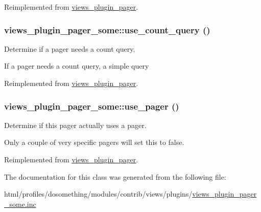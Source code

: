 Reimplemented from \hyperlink{classviews__plugin__pager_a12df2a012d53b9276a14fae94511f686}{views\_\-plugin\_\-pager}.\hypertarget{classviews__plugin__pager__some_adb625dcd5e5cf98f964f4e1c25681a6e}{
\subsubsection[{use\_\-count\_\-query}]{\setlength{\rightskip}{0pt plus 5cm}views\_\-plugin\_\-pager\_\-some::use\_\-count\_\-query ()}}
\label{classviews__plugin__pager__some_adb625dcd5e5cf98f964f4e1c25681a6e}
Determine if a pager needs a count query.

If a pager needs a count query, a simple query 

Reimplemented from \hyperlink{classviews__plugin__pager_a693a102e85a9b63bc59057a4efca0d12}{views\_\-plugin\_\-pager}.\hypertarget{classviews__plugin__pager__some_a095fbbfc79c16f25158348a0e8eada83}{
\subsubsection[{use\_\-pager}]{\setlength{\rightskip}{0pt plus 5cm}views\_\-plugin\_\-pager\_\-some::use\_\-pager ()}}
\label{classviews__plugin__pager__some_a095fbbfc79c16f25158348a0e8eada83}
Determine if this pager actually uses a pager.

Only a couple of very specific pagers will set this to false. 

Reimplemented from \hyperlink{classviews__plugin__pager_a0b77996aaa7a7b23effc4d3a6e055659}{views\_\-plugin\_\-pager}.

The documentation for this class was generated from the following file:\begin{DoxyCompactItemize}
\item 
html/profiles/dosomething/modules/contrib/views/plugins/\hyperlink{views__plugin__pager__some_8inc}{views\_\-plugin\_\-pager\_\-some.inc}\end{DoxyCompactItemize}
